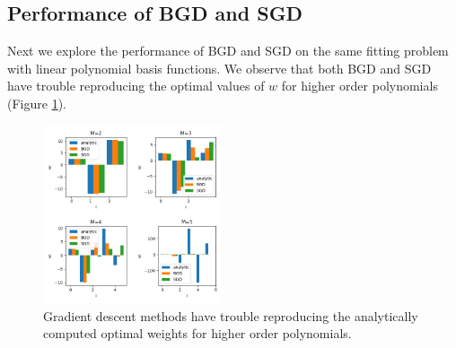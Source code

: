 \documentclass[10pt]{article}
\begin{document}


\subsection{Performance of BGD and SGD}

Next we explore the performance of BGD and SGD on the same fitting problem with linear polynomial basis functions. We observe that both BGD and SGD have trouble reproducing the optimal values of $w$ for higher order polynomials (Figure \ref{fig:gd_weights}). 

\begin{figure}
\caption{Gradient descent methods have trouble reproducing the analytically computed optimal weights for higher order polynomials.}
\begin{center}
\includegraphics[width=200px]{all_weights}
\end{center}
\label{fig:gd_weights}
\end{figure}
\end{document}
